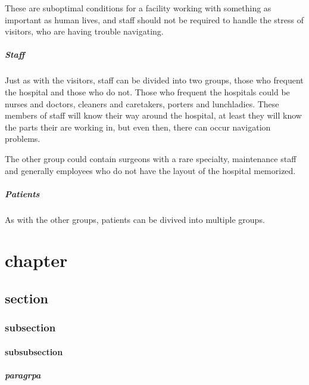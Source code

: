 These are suboptimal conditions for a facility working with something as important as human lives, and staff should not be required to handle the stress of visitors, who are having trouble navigating.

\paragraph{Staff} %

 
Just as with the visitors, staff can be divided into two groups, those who frequent the hospital and those who do not. Those who frequent the hospitals could be nurses and doctors, cleaners and caretakers, porters and lunchladies. These members of staff will know their way around the hospital, at least they will know the parts their are working in, but even then, there can occur navigation problems. 

The other group could contain surgeons with a rare specialty, maintenance staff and generally employees who do not have the layout of the hospital memorized.

\paragraph{Patients} %


As with the other groups, patients can be divived into multiple groups. 

\chapter{chapter} %
\label{cha:test}
\section{section} %
\label{sec:section}
\subsection{subsection} %
\label{sub:subsection}
\subsubsection{subsubsection} %
\label{ssub:subsubsection}


\paragraph{paragrpa} %








